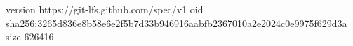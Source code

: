 version https://git-lfs.github.com/spec/v1
oid sha256:3265d836e8b58e6e2f5b7d33b946916aabfb2367010a2e2024c0e9975f629d3a
size 626416
